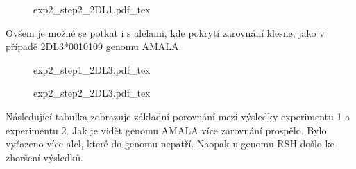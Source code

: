 \documentclass[czech,DP]{thesiskiv}
\numberwithin{equation}{section}
\begin{document}
\begin{figure}[H]
	\centering
    \def\svgwidth{\columnwidth}
    {exp2_step2_2DL1.pdf_tex} 
\end{figure}

\noindent
Ovšem je možné se potkat i s alelami, kde pokrytí zarovnání klesne, jako v případě 2DL3*0010109 genomu AMALA.

\begin{figure}[H]
	\centering
    \def\svgwidth{\columnwidth}
    {exp2_step1_2DL3.pdf_tex} 
\end{figure}

\begin{figure}[H]
	\centering
    \def\svgwidth{\columnwidth}
    {exp2_step2_2DL3.pdf_tex} 
\end{figure}

\noindent
Následující tabulka zobrazuje základní porovnání mezi výsledky experimentu 1 a experimentu 2. Jak je vidět genomu AMALA více zarovnání prospělo. Bylo vyřazeno více alel, které do genomu nepatří. Naopak u genomu RSH došlo ke zhoršení výsledků.
\end{document}
